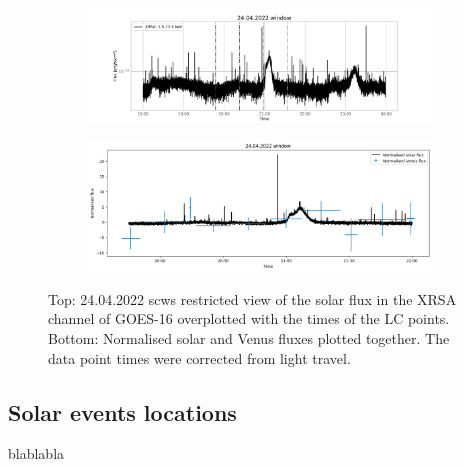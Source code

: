     \begin{figure}[H]
        \centering
        \begin{subfigure}{\textwidth}
            \includegraphics[width=\textwidth]{report/Figures/results/GOES_24.png}
        \end{subfigure}%
        \hspace{1em}
        \begin{subfigure}{\textwidth}
            \centering
            \includegraphics[width=\textwidth]{report/Figures/results/norm_24.png}
        \end{subfigure}
        \caption{Top: 24.04.2022 scws restricted view of the solar flux in the XRSA channel of GOES-16 overplotted with the times of the LC points.
        Bottom: Normalised solar and Venus fluxes plotted together. The data point times were corrected from light travel.}
        \label{goes_24}
    \end{figure}

    
    \subsection{Solar events locations}
    blablabla

